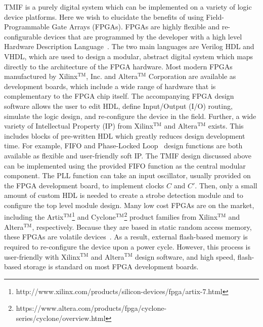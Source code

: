 \documentclass{ws-jai}
\begin{document}
TMIF is a purely digital system which can be implemented on a variety of logic device platforms. Here we wish to elucidate the benefits of using Field-Programmable Gate Arrays (FPGAs). FPGAs are highly flexible and re-configurable devices that are programmed by the developer with a high level Hardware Description Language~\cite[HDL;][]{Mano08}. The two main languages are Verilog HDL and VHDL, which are used to design a modular, abstract digital system which maps directly to the architecture of the FPGA hardware. Most modern FPGAs manufactured by Xilinx$^\text{TM}$, Inc. and Altera$^\text{TM}$ Corporation are available as development boards, which include a wide range of hardware that is complementary to the FPGA chip itself. The accompanying FPGA design software allows the user to edit HDL, define Input/Output (I/O) routing, simulate the logic design, and re-configure the device in the field. Further, a wide variety of Intellectual Property (IP) from Xilinx$^\text{TM}$ and Altera$^\text{TM}$ exists. This includes blocks of pre-written HDL which greatly reduces design development time. For example, FIFO and Phase-Locked Loop~\cite[PLL;][]{Horowitz89} design functions are both available as flexible and user-friendly soft IP. The TMIF design discussed above can be implemented using the provided FIFO function as the central modular component. The PLL function can take an input oscillator, usually provided on the FPGA development board, to implement clocks $C$ and $C'$. Then, only a small amount of custom HDL is needed to create a strobe detection module and to configure the top level module design. Many low cost FPGAs are on the market, including the Artix$^\text{TM}$\footnote{http://www.xilinx.com/products/silicon-devices/fpga/artix-7.html} and Cyclone$^\text{TM}$\footnote{https://www.altera.com/products/fpga/cyclone-series/cyclone/overview.html} product families from Xilinx$^\text{TM}$ and Altera$^\text{TM}$, respectively. Because they are based in static random access memory, these FPGAs are volatile devices~\cite{Plonus01}. As a result, external flash-based memory is required to re-configure the device upon a power cycle. However, this process is user-friendly with Xilinx$^\text{TM}$ and Altera$^\text{TM}$ design software, and high speed, flash-based storage is standard on most FPGA development boards. 
\end{document}
